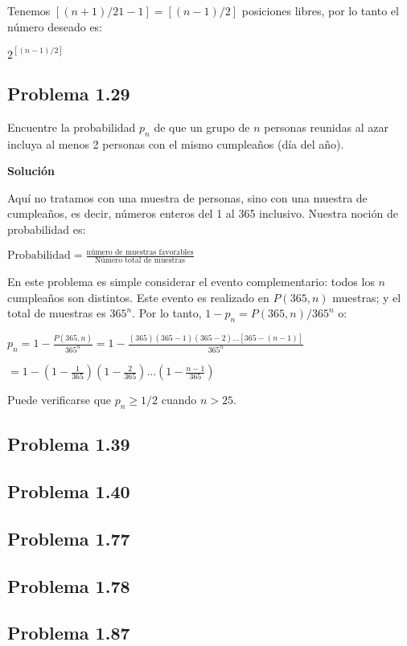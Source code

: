 \documentclass[12pt]{article}
\begin{document}
Tenemos $[(n + 1)/21- 1 ]= [(n - 1)/2]$ posiciones libres, por lo tanto el número
deseado es:

$2^{[(n-1)/2]}$


\subsection*{Problema 1.29}
Encuentre la probabilidad $p_n$ de que un grupo de $n$ personas reunidas al azar
incluya al menos 2 personas con el mismo cumpleaños (día del año).

\textbf{Solución}

Aquí no tratamos con una muestra de personas, sino con una muestra de
cumpleaños, es decir, números enteros del 1 al 365 inclusivo. Nuestra noción de
probabilidad es:

$\text{Probabilidad} = \frac{\text{número de muestras favorables}}{\text{Número total de muestras}}$

En este problema es simple considerar el evento complementario: todos los $n$
cumpleaños son distintos. Este evento es realizado en $P(365,n)$ muestras; y el
total de muestras es $365^n$. Por lo tanto, $1-p_n = P(365,n)/365^n$ o:

$p_n = 1 - \frac{P(365,n)}{365^n} = 1 -
\frac{(365)(365-1)(365-2)...[365-(n-1)]}{365^n} $

$= 1-(1 - \frac{1}{365})(1 - \frac{2}{365})...(1 - \frac{n-1}{365})$

Puede verificarse que $p_n \geq 1/2 $ cuando $n>25$.

\subsection*{Problema 1.39}

\subsection*{Problema 1.40}

\subsection*{Problema 1.77}

\subsection*{Problema 1.78}

\subsection*{Problema 1.87}
\end{document}
